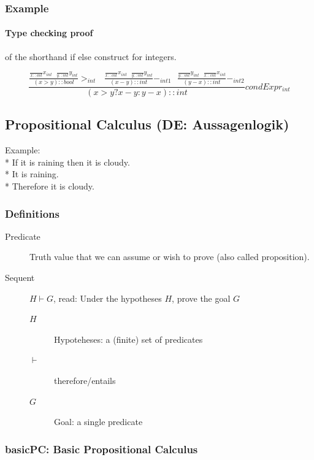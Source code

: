 \subsubsection{Example}

\paragraph{Type checking proof}

of the shorthand if else construct for integers.

\[
	\frac{
			\frac{
				\frac{}{x::int}x_{int} \text{   } \frac{}{y::int}y_{int}
			}{(x > y)::bool}>_{int} \text{   }
		  \frac{
				\frac{}{x::int}x_{int} \text{   } \frac{}{y::int}y_{int}
			}{(x - y)::int} -_{int1} \text{   }
			\frac{
				\frac{}{y::int}y_{int} \text{   } \frac{}{x::int}x_{int}
			}{(y - x)::int} -_{int2}
		}{(x>y? x - y : y - x)::int} condExpr_{int}
\]

\subsection{Propositional Calculus (DE: Aussagenlogik)}

Example:\\*
If it is raining then it is cloudy.\\*
It is raining.\\*
Therefore it is cloudy.

\subsubsection{Definitions}
\begin{description}
	\item[Predicate] Truth value that we can assume or wish to prove (also called proposition).
	\item[Sequent] $H \vdash G$, read: Under the hypotheses $H$, prove the goal $G$ \hfill \\
	\begin{description}
		\item[$H$] Hypoteheses: a (finite) set of predicates
		\item[$\vdash$] therefore/entails
		\item[$G$] Goal: a single predicate
	\end{description}
\end{description}

\subsubsection{basicPC: Basic Propositional Calculus}

